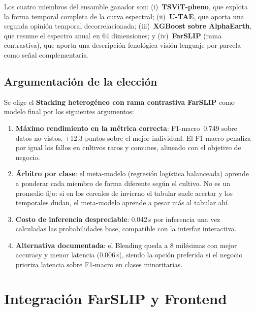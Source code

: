 \documentclass{article}
\begin{document}
Los cuatro miembros del ensamble ganador son: (i)~\textbf{TSViT-pheno},
que explota la forma temporal completa de la curva espectral;
(ii)~\textbf{U-TAE}, que aporta una segunda opinión temporal
decorrelacionada; (iii)~\textbf{XGBoost sobre AlphaEarth}, que resume el
espectro anual en 64 dimensiones; y (iv)~\textbf{FarSLIP} (rama
contrastiva), que aporta una descripción fenológica visión-lenguaje por
parcela como señal complementaria.

\subsection{Argumentación de la elección}

Se elige el \textbf{Stacking heterogéneo con rama contrastiva FarSLIP}
como modelo final por los siguientes argumentos:

\begin{enumerate}[leftmargin=*]
    \item \textbf{Máximo rendimiento en la métrica correcta}: F1-macro~0.749
    sobre datos no vistos, +12.3 puntos sobre el mejor individual. El
    F1-macro penaliza por igual los fallos en cultivos raros y comunes,
    alineado con el objetivo de negocio.

    \item \textbf{Árbitro por clase}: el meta-modelo (regresión logística
    balanceada) aprende a ponderar cada miembro de forma diferente según
    el cultivo. No es un promedio fijo: si en los cereales de invierno el
    tabular suele acertar y los temporales dudan, el meta-modelo aprende
    a pesar más al tabular ahí.

    \item \textbf{Costo de inferencia despreciable}: 0.042\,s por inferencia
    una vez calculadas las probabilidades base, compatible con la interfaz
    interactiva.

    \item \textbf{Alternativa documentada}: el Blending queda a 8 milésimas
    con mejor accuracy y menor latencia (0.006\,s), siendo la opción
    preferida si el negocio prioriza latencia sobre F1-macro en clases
    minoritarias.
\end{enumerate}

\section{Integración FarSLIP y Frontend}
\end{document}

